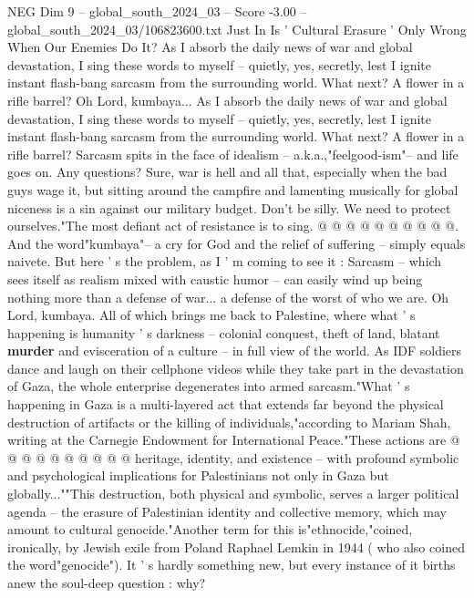 \begin{textsample}{NEG Dim 9 – global\_south\_2024\_03 – Score -3.00 – global\_south\_2024\_03/106823600.txt}  \label{ex:f9_neg_377}
Just In Is ' Cultural Erasure ' Only Wrong When Our Enemies Do It?
As I absorb the daily news of war and global devastation, I sing these words to myself -- quietly, yes, secretly, lest I ignite instant flash-bang sarcasm from the surrounding world.
What next?
A flower in a rifle barrel?
Oh Lord, kumbaya...
As I absorb the daily news of war and global devastation, I sing these words to myself -- quietly, yes, secretly, lest I ignite instant flash-bang sarcasm from the surrounding world.
What next?
A flower in a rifle barrel?
Sarcasm spits in the face of idealism -- a.k.a.,"feelgood-ism"-- and life goes on.
Any questions?
Sure, war is hell and all that, especially when the bad guys wage it, but sitting around the campfire and lamenting musically for global niceness is a sin against our military budget.
Don't be silly.
We need to protect ourselves."The most defiant act of resistance is to sing. @ @ @ @ @ @ @ @ @ @.
And the word"kumbaya"-- a cry for God and the relief of suffering -- simply equals naivete.
But here ' s the problem, as I ' m coming to see it : Sarcasm -- which sees itself as realism mixed with caustic humor -- can easily wind up being nothing more than a defense of war... a defense of the worst of who we are.
Oh Lord, kumbaya.
All of which brings me back to Palestine, where what ' s happening is humanity ' s darkness -- colonial conquest, theft of land, blatant \textbf{murder} and evisceration of a culture -- in full view of the world.
As IDF soldiers dance and laugh on their cellphone videos while they take part in the devastation of Gaza, the whole enterprise degenerates into armed sarcasm."What ' s happening in Gaza is a multi-layered act that extends far beyond the physical destruction of artifacts or the killing of individuals,"according to Mariam Shah, writing at the Carnegie Endowment for International Peace."These actions are @ @ @ @ @ @ @ @ @ @ heritage, identity, and existence -- with profound symbolic and psychological implications for Palestinians not only in Gaza but globally...""This destruction, both physical and symbolic, serves a larger political agenda -- the erasure of Palestinian identity and collective memory, which may amount to cultural genocide."Another term for this is"ethnocide,"coined, ironically, by Jewish exile from Poland Raphael Lemkin in 1944 ( who also coined the word"genocide").
It ' s hardly something new, but every instance of it births anew the soul-deep question : why?

\end{textsample}
